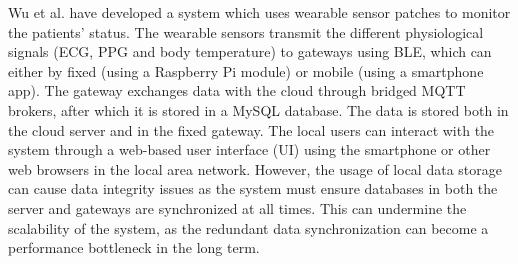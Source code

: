 %
%


Wu et al. \cite{Wu2020} have developed a system which uses wearable sensor patches to monitor the patients' status. The wearable sensors transmit the different physiological signals (\acs{ECG}, \acs{PPG} and body temperature) to gateways using \acs{BLE}, which can either by fixed (using a Raspberry Pi module) or mobile (using a smartphone app). The gateway exchanges data with the cloud through bridged \acs{MQTT} brokers, after which it is stored in a MySQL database. The data is stored both in the cloud server and in the fixed gateway. The local users can interact with the system through a web-based user interface (UI) using the smartphone or other web browsers in the local area network. However, the usage of local data storage can cause data integrity issues as the system must ensure databases in both the server and gateways are synchronized at all times. This can undermine the scalability of the system, as the redundant data synchronization can become a performance bottleneck in the long term. \bigskip

%
%

